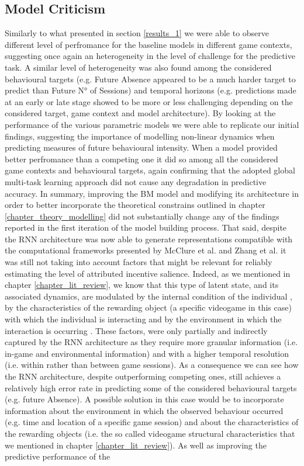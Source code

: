 \subsection{Model Criticism}
\label{model_criticims_2}
Similarly to what presented in section \ref{results_1} we were able to observe different level of perfromance for the baseline models in different game contexts, suggesting once again an heterogeneity in the level of challenge for the predictive task. A similar level of heterogeneity was also found among the considered behavioural targets (e.g. Future Absence appeared to be a much harder target to predict than Future N° of Sessions) and temporal horizons (e.g. predictions made at an early or late stage showed to be more or less challenging depending on the considered target, game context and model architecture). By looking at the performance of the various parametric models we were able to replicate our initial findings, suggesting the importance of modelling non-linear dynamics when predicting measures of future behavioural intensity. When a model provided better perfromance than a competing one it did so among all the considered game contexts and behavioural targets, again confirming that the adopted global multi-task learning approach did not cause any degradation in predictive accuracy. In summary, improving the BM model and modifying its architecture in order to better incorporate the theoretical constrains outlined in chapter \ref{chapter_theory_modelling} did not substantially change any of the findings reported in the first iteration of the model building process. That said, despite the RNN architecture was now able to generate representations compatible with the computational frameworks presented by McClure et al. \cite{mcclure2003computational} and Zhang et al. \cite{zhang2009neural} it was still not taking into account factors that might be relevant for reliably estimating the level of attributed incentive salience. Indeed, as we mentioned in chapter \ref{chapter_lit_review}, we know that this type of latent state, and its associated dynamics, are modulated by the internal condition of the individual \cite{zhang2009neural}, by the characteristics of the rewarding object (a specific videogame in this case) with which the individual is interacting and by the environment in which the interaction is occurring \cite{palminteri2015contextual}. These factors, were only partially and indirectly captured by the RNN architecture as they require more granular information (i.e. in-game and environmental information) and with a higher temporal resolution (i.e. within rather than between game sessions). As a consequence we can see how the RNN architecture, despite outperforming competing ones, still achieves a relatively high error rate in predicting some of the considered behavioural targets (e.g. future Absence). A possible solution in this case would be to incorporate information about the environment in which the observed behaviour occurred (e.g. time and location of a specific game session) and about the characteristics of the rewarding objects (i.e. the so called videogame structural characteristics that we mentioned in chapter \ref{chapter_lit_review}). As well as improving the predictive performance of the 